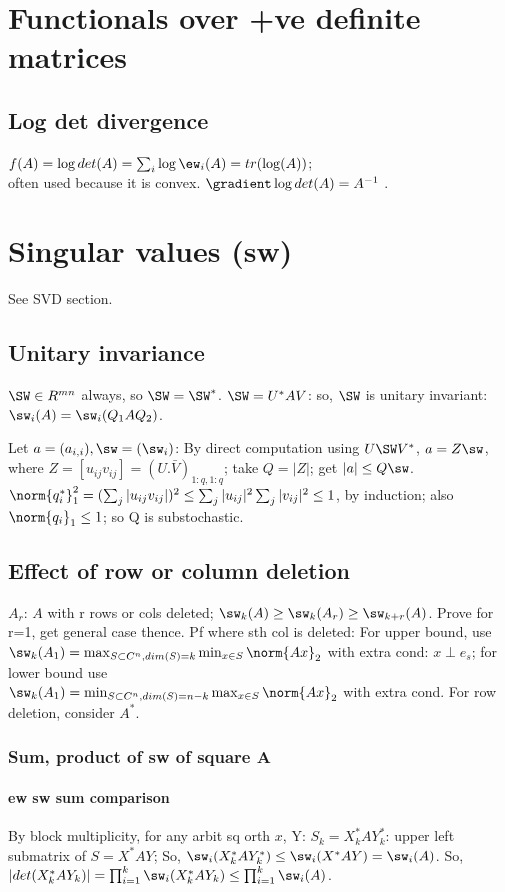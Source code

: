 \documentclass[oneside, article]{memoir}
\begin{document}
\section{Functionals over +ve definite matrices}
\subsection{Log det divergence}
$f(A) = \log det(A) = \sum_i \log \ew_i(A) = tr(\log(A))$;\\
 often used because it is convex. $\gradient \log det(A) = A^{-1}$ \why.

\section{Singular values (sw)}
See SVD section.

\subsection{Unitary invariance}
$\SW \in R^{mn}$ always, so $\SW = \SW^{*}$. $\SW = U^{*}AV$: so, $\SW$ is unitary invariant: $\sw_{i}(A) = \sw_{i}(Q_{1}AQ_{2})$.

Let $a = (a_{i,i}), \sw = (\sw_{i})$: By direct computation using $U\SW V^{*}$, $a = Z\sw$, where $Z = [u_{ij}v_{ij}] = (U.\bar{V})_{1:q, 1:q}$; take $Q = |Z|$; get $|a| \leq Q \sw$. $\norm{q_{i}^{*}}_{1}^{2} = (\sum_{j} |u_{ij}v_{ij}|)^{2} \leq \sum_{j} |u_{ij}|^{2}\sum_{j} |v_{ij}|^{2} \leq 1$, by induction; also $\norm{q_{i}}_{1} \leq 1$; so Q is substochastic.

\subsection{Effect of row or column deletion}
$A_{r}$: $A$ with r rows or cols deleted; $\sw_{k}(A) \geq \sw_{k}(A_{r}) \geq \sw_{k+r}(A)$. Prove for r=1, get general case thence. Pf where sth col is deleted: For upper bound, use $\sw_{k}(A_{1}) = \max_{S \subset C^{n}, dim(S) = k} \min_{x \in S} \norm{Ax}_{2}$ with extra cond: $x \perp e_{s}$; for lower bound use \\
$\sw_{k}(A_{1}) = \min_{S \subset C^{n}, dim(S) = n-k} \max_{x \in S} \norm{Ax}_{2}$ with extra cond. For row deletion, consider $A^{*}$.

\subsubsection{Sum, product of sw of square A}
\paragraph*{ew sw sum comparison}
By block multiplicity, for any arbit sq orth $x$, Y: $S_{k} = X_{k}^{*}AY_{k}^{*}$: upper left submatrix of $S = X^{*}AY$; So, $\sw_{i}(X_{k}^{*}AY_{k}^{*}) \leq \sw_{i}(X^{*}AY) = \sw_{i}(A)$. So, $|det(X_{k}^{*}AY_{k})| = \prod_{i=1}^{k} \sw_{i}(X_{k}^{*}AY_{k}) \leq \prod_{i=1}^{k} \sw_{i}(A)$.
\end{document}
